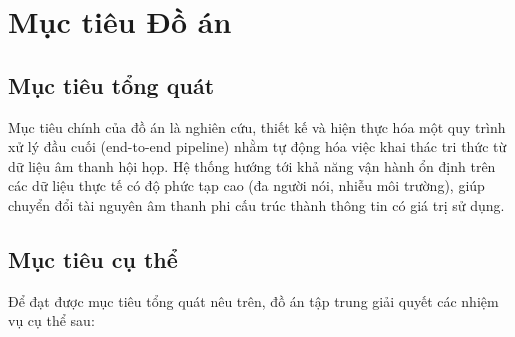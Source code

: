 \section{Mục tiêu Đồ án}

\subsection{Mục tiêu tổng quát}
Mục tiêu chính của đồ án là nghiên cứu, thiết kế và hiện thực hóa một quy trình xử lý đầu cuối (end-to-end pipeline) nhằm tự động hóa việc khai thác tri thức từ dữ liệu âm thanh hội họp. Hệ thống hướng tới khả năng vận hành ổn định trên các dữ liệu thực tế có độ phức tạp cao (đa người nói, nhiễu môi trường), giúp chuyển đổi tài nguyên âm thanh phi cấu trúc thành thông tin có giá trị sử dụng.

\subsection{Mục tiêu cụ thể}
Để đạt được mục tiêu tổng quát nêu trên, đồ án tập trung giải quyết các nhiệm vụ cụ thể sau:

